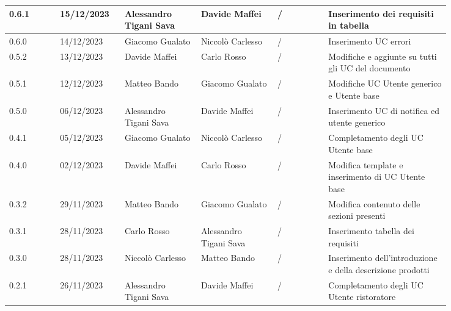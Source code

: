 {\begin{longtable}{p{0.10\linewidth}p{0.10\linewidth}p{0.15\linewidth}p{0.15\linewidth}p{0.10\linewidth}p{0.24\linewidth}}
	  \hline
	  0.6.1             & 15/12/2023    & Alessandro Tigani Sava & Davide Maffei          & /                      & Inserimento dei requisiti in tabella                                     \\
	  \hline
	  0.6.0             & 14/12/2023    & Giacomo Gualato        & Niccolò Carlesso       & /                      & Inserimento UC errori                                                    \\
	  \hline
	  0.5.2             & 13/12/2023    & Davide Maffei          & Carlo Rosso            & /                      & Modifiche e aggiunte su tutti gli UC del documento                       \\
	  \hline
	  0.5.1             & 12/12/2023    & Matteo Bando           & Giacomo Gualato        & /                      & Modifiche UC Utente generico e Utente base                               \\
	  \hline
	  0.5.0             & 06/12/2023    & Alessandro Tigani Sava & Davide Maffei          & /                      & Inserimento UC di notifica ed utente generico                            \\
	  \hline
	  0.4.1             & 05/12/2023    & Giacomo Gualato        & Niccolò Carlesso       & /                      & Completamento degli UC Utente base                                       \\
	  \hline
	  0.4.0             & 02/12/2023    & Davide Maffei          & Carlo Rosso            & /                      & Modifica template e inserimento di UC Utente base                        \\
	  \hline
	  0.3.2             & 29/11/2023    & Matteo Bando           & Giacomo Gualato        & /                      & Modifica contenuto delle sezioni presenti                                \\
	  \hline
	  0.3.1             & 28/11/2023    & Carlo Rosso            & Alessandro Tigani Sava & /                      & Inserimento tabella dei requisiti                                        \\
	  \hline
	  0.3.0             & 28/11/2023    & Niccolò Carlesso       & Matteo Bando           & /                      & Inserimento dell'introduzione e della descrizione prodotti               \\
	  \hline
	  0.2.1             & 26/11/2023    & Alessandro Tigani Sava & Davide Maffei          & /                      & Completamento degli UC Utente ristoratore                                \\

\end{longtable}}
